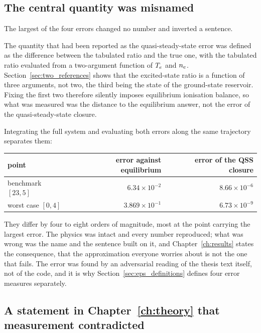 \subsection{The central quantity was misnamed}

The largest of the four errors changed no number and inverted a sentence.

The quantity that had been reported as the quasi-steady-state error was
defined as the difference between the tabulated ratio and the true
one, with the tabulated ratio evaluated from a two-argument function of $T_e$
and $n_e$. Section~\ref{sec:two_references} shows that the excited-state ratio
is a function of three arguments, not two, the third being the state of the
ground-state reservoir. Fixing the first two therefore silently imposes
equilibrium ionisation balance, so what was measured was the distance to the
equilibrium answer, not the error of the quasi-steady-state closure.

Integrating the full system and evaluating both errors along the same trajectory
separates them:

\begin{center}
\begin{tabular}{lrr}
  \toprule
  point & error against equilibrium & error of the QSS closure \\
  \midrule
  benchmark $[23,5]$ & $6.34\times10^{-2}$ & $8.66\times10^{-6}$ \\
  worst case $[0,4]$ & $3.869\times10^{-1}$ & $6.73\times10^{-9}$ \\
  \bottomrule
\end{tabular}
\end{center}

They differ by four to eight orders of magnitude, most at the point carrying the
largest error. The physics was intact and every number reproduced; what was
wrong was the name and the sentence built on it, and Chapter~\ref{ch:results}
states the consequence, that the approximation everyone worries about is not
the one that fails. The error was found by an adversarial reading of the thesis text
itself, not of the code, and it is why Section~\ref{sec:eps_definitions}
defines four error measures separately.

\subsection{A statement in Chapter~\ref{ch:theory} that measurement contradicted}
\label{sec:promise_broken}

